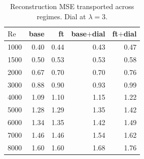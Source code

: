 \begin{table}[t]
  \centering
  \caption{Reconstruction MSE transported across regimes. Dial at $\lambda=3$.}
  \label{tab:transfer-mse}
  \begin{tabular}{lrrrr}
    \toprule
    $\mathrm{Re}$ & base & ft & base$+$dial & ft$+$dial \\
    \midrule
    1000 & 0.40 & 0.44 & 0.43 & 0.47 \\
    1500 & 0.50 & 0.53 & 0.53 & 0.58 \\
    2000 & 0.67 & 0.70 & 0.70 & 0.76 \\
    3000 & 0.88 & 0.90 & 0.93 & 0.99 \\
    4000 & 1.09 & 1.10 & 1.15 & 1.22 \\
    5000 & 1.28 & 1.29 & 1.35 & 1.42 \\
    6000 & 1.34 & 1.35 & 1.42 & 1.49 \\
    7000 & 1.46 & 1.46 & 1.54 & 1.62 \\
    8000 & 1.60 & 1.60 & 1.68 & 1.76 \\
    \bottomrule
  \end{tabular}
\end{table}
